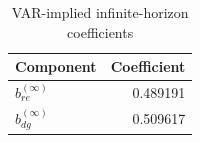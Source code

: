 \begin{table}[htbp]
  \centering
  \caption{VAR-implied infinite-horizon coefficients}
  \label{tab:q1d}
  \begin{tabular}{lr}
    \toprule
    Component & Coefficient \\
    \midrule
    $b_{re}^{(\infty)}$ & 0.489191 \\
    $b_{dg}^{(\infty)}$ & 0.509617 \\
    \bottomrule
  \end{tabular}
\end{table}
